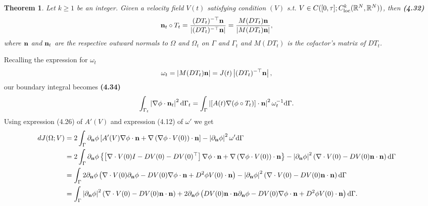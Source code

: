 \documentclass[oneside]{book}
\numberwithin{equation}{section}
\newtheorem{theorem}{Theorem}[section]
\begin{document}
\begin{theorem}
    Let $k\ge 1$ be an integer. Given a velocity field $V(t)$ satisfying condition $(V)$ s.t. $V\in C([0,\tau];C_{\rm loc}^k(\mathbb{R}^N,\mathbb{R}^N))$, then \textbf{(4.32)}
    \begin{align*}
        {\bf n}_t\circ T_t = \frac{(DT_t)^{-\top}{\bf n}}{\left|(DT_t)^{-\top}{\bf n}\right|} = \frac{M(DT_t){\bf n}}{\left|M(DT_t){\bf n}\right|},
    \end{align*}
    where ${\bf n}$ and ${\bf n}_t$ are the respective outward normals to $\Omega$ and $\Omega_t$ on $\Gamma$ and $\Gamma_t$ and $M(DT_t)$ is the cofactor's matrix of $DT_t$.
\end{theorem}
Recalling the expression for $\omega_t$
\begin{align*}
    \omega_t = \left|M(DT_t){\bf n}\right| = J(t)\left|(DT_t)^{-\top}{\bf n}\right|,
\end{align*}
our boundary integral becomes \textbf{(4.34)}
\begin{align*}
    \int_{\Gamma_t} \left|\nabla\phi\cdot{\bf n}_t\right|^2{\rm d}\Gamma_t = \int_\Gamma \left|[A(t)\nabla(\phi\circ T_t)]\cdot{\bf n}\right|^2\omega_t^{-1}{\rm d}\Gamma.
\end{align*}
Using expression (4.26) of $A'(V)$ and expression (4.12) of $\omega'$ we get
\begin{align*}
    dJ(\Omega;V) &= 2\int_\Gamma \partial_{\bf n}\phi\left[A'(V)\nabla\phi\cdot{\bf n} + \nabla\left(\nabla\phi\cdot V(0)\right)\cdot{\bf n}\right] - \left|\partial_{\bf n}\phi\right|^2\omega'{\rm d}\Gamma\\
    &= 2\int_\Gamma \partial_{\bf n}\phi\left\{\left[\nabla\cdot V(0)I - DV(0) - DV(0)^\top\right]\nabla\phi\cdot{\bf n} + \nabla\left(\nabla\phi\cdot V(0)\right)\cdot{\bf n}\right\} - \left|\partial_{\bf n}\phi\right|^2\left(\nabla\cdot V(0) - DV(0){\bf n}\cdot{\bf n}\right){\rm d}\Gamma\\
    &= \int_\Gamma 2\partial_{\bf n}\phi\left(\nabla\cdot V(0)\partial_{\bf n}\phi - DV(0)\nabla\phi\cdot{\bf n} + D^2\phi V(0)\cdot{\bf n}\right) - \left|\partial_{\bf n}\phi\right|^2\left(\nabla\cdot V(0) - DV(0){\bf n}\cdot{\bf n}\right){\rm d}\Gamma\\
    &= \int_\Gamma \left|\partial_{\bf n}\phi\right|^2\left(\nabla\cdot V(0) - DV(0){\bf n}\cdot{\bf n}\right) + 2\partial_{\bf n}\phi\left(DV(0){\bf n}\cdot{\bf n}\partial_{\bf n}\phi - DV(0)\nabla\phi\cdot{\bf n} + D^2\phi V(0)\cdot{\bf n}\right){\rm d}\Gamma.
\end{align*}
\end{document}
